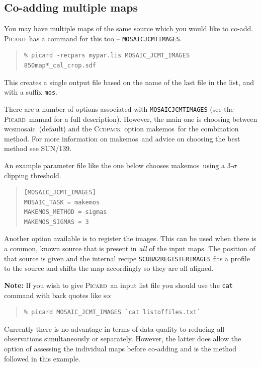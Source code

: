 \documentclass[twoside,11pt]{article}
\newcommand{\xref}[3]{#1}
\newcommand{\xlabel}[1]{}
\renewcommand{\_}{\texttt{\symbol{95}}}
\newenvironment{myquote}{\begin{quote}\begin{small}}{\end{small}\end{quote}}
\newcommand{\ccdpack}{\xref{\textsc{Ccdpack}}{sun139}{}}
\newcommand{\picard}{\xref{\textsc{Picard}}{sun265}{}}
\newcommand{\task}[1]{\textsf{#1}}
\newcommand{\param}[1]{\texttt{#1}}
\newcommand{\wcsmosaic}{\xref{\task{wcsmosaic}}{sun95}{WCSMOSAIC}}
\newcommand{\makemos}{\xref{\task{makemos}}{sun139}{MAKEMOS}}
\begin{document}
\subsection{\xlabel{coadd}Co-adding multiple maps}
\label{sec:coadd}

You may have multiple maps of the same source which you would like to
co-add. \picard\ has a command for this too --
\param{MOSAIC\_JCMT\_IMAGES}.
\begin{myquote}
\begin{verbatim}
% picard -recpars mypar.lis MOSAIC_JCMT_IMAGES 850map*_cal_crop.sdf
\end{verbatim}
\end{myquote}
This creates a single output file based on the name of the last file
in the list, and with a suffix \texttt{\_mos}.

There are a number of options associated with
\param{MOSAIC\_JCMT\_IMAGES} (see the \picard\ manual for a full
description). However, the main one is choosing between \wcsmosaic\
(default) and the \ccdpack\ option \makemos\ for the combination
method. For more information on \makemos\ and advice on choosing the
best method see SUN/139.

An example parameter file like the one below chooses \makemos\ using a
3-$\sigma$ clipping threshold.
\begin{myquote}
\begin{verbatim}
[MOSAIC_JCMT_IMAGES]
MOSAIC_TASK = makemos
MAKEMOS_METHOD = sigmas
MAKEMOS_SIGMAS = 3
\end{verbatim}
\end{myquote}
Another option available is to register the images. This can be used
when there is a common, known source that is present in \emph{all} of
the input maps. The position of that source is given and the internal
recipe \param{SCUBA2\_REGISTER\_IMAGES} fits a profile to the source
and shifts the map accordingly so they are all aligned.

\textbf{Note:} If you wish to give \picard\ an input list file you should
use the \texttt{cat} command with back quotes like so:
\begin{myquote}
\begin{verbatim}
% picard MOSAIC_JCMT_IMAGES `cat listoffiles.txt`
\end{verbatim}
\end{myquote}


Currently there is no advantage in terms of data quality to reducing
all observations simultaneously or separately. However, the latter
does allow the option of assessing the individual maps before co-adding
and is the method followed in this example.
\end{document}
